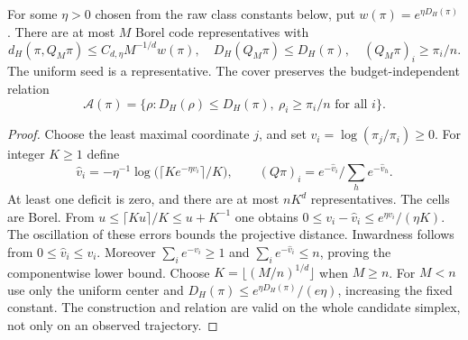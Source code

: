 \begin{lemma}\label{lem:filtercover}
For some $\eta>0$ chosen from the raw class constants below, put $w(\pi)=e^{\eta D_H(\pi)}$. There are at most $M$ Borel code representatives with
\[
 d_H(\pi,Q_M\pi)\le C_{d,\eta}M^{-1/d}w(\pi),\quad
 D_H(Q_M\pi)\le D_H(\pi),\quad (Q_M\pi)_i\ge\pi_i/n.
\]
The uniform seed is a representative. The cover preserves the budget-independent relation
\begin{equation}\label{eq:filterrelation}
 \mathcal A(\pi)=\{\rho:D_H(\rho)\le D_H(\pi),\ \rho_i\ge\pi_i/n\text{ for all }i\}.
\end{equation}
\end{lemma}
\begin{proof}
Choose the least maximal coordinate $j$, and set $v_i=\log(\pi_j/\pi_i)\ge0$. For integer $K\ge1$ define
\[
 \widehat v_i=-\eta^{-1}\log\bigl(\lceil Ke^{-\eta v_i}\rceil/K\bigr),
 \qquad (Q\pi)_i=e^{-\widehat v_i}/\sum_h e^{-\widehat v_h}.
\]
At least one deficit is zero, and there are at most $nK^d$ representatives. The cells are Borel. From $u\le\lceil Ku\rceil/K\le u+K^{-1}$ one obtains
$0\le v_i-\widehat v_i\le e^{\eta v_i}/(\eta K)$.
The oscillation of these errors bounds the projective distance. Inwardness follows from $0\le\widehat v_i\le v_i$. Moreover $\sum_i e^{-v_i}\ge1$ and $\sum_i e^{-\widehat v_i}\le n$, proving the componentwise lower bound. Choose $K=\lfloor(M/n)^{1/d}\rfloor$ when $M\ge n$. For $M<n$ use only the uniform center and $D_H(\pi)\le e^{\eta D_H(\pi)}/(e\eta)$, increasing the fixed constant. The construction and relation are valid on the whole candidate simplex, not only on an observed trajectory.
\end{proof}

